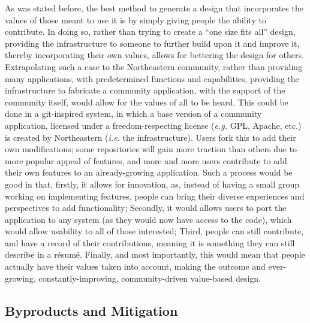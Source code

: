 \documentclass[conference]{IEEEtran}
\begin{document}
As was stated before, the best method to generate a design that incorporates the values of those meant to use it is by simply giving people the ability to contribute. In doing so, rather than trying to create a ``one size fits all'' design, providing the infrastructure to someone to further build upon it and improve it, thereby incorporating their own values, allows for bettering the design for others. Extrapolating such a case to the Northeastern community, rather than providing many applications, with predetermined functions and capabilities, providing the infrastructure to fabricate a community application, with the support of the community itself, would allow for the values of all to be heard. This could be done in a git-inspired system, in which a base version of a community application, licensed under a freedom-respecting license (\textit{e.g.} GPL, Apache, etc.) is created by Northeastern (\textit{i.e.} the infrastructure). Users fork this to add their own modifications; some repositories will gain more traction than others due to more popular appeal of features, and more and more users contribute to add their own features to an already-growing application. Such a process would be good in that, firstly, it allows for innovation, as, instead of having a small group working on implementing features, people can bring their diverse experiences and perspectives to add functionality; Secondly, it would allows users to port the application to any system (as they would now have access to the code), which would allow usability to all of those interested; Third, people can still contribute, and have a record of their contributions, meaning it is something they can still describe in a r\'esum\'e. Finally, and most importantly, this would mean that people actually have their values taken into account, making the outcome and ever-growing, constantly-improving, community-driven value-based design.

\subsection{Byproducts and Mitigation}
\end{document}
